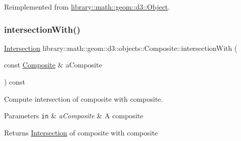 Reimplemented from \hyperlink{classlibrary_1_1math_1_1geom_1_1d3_1_1_object_a609b1ea1d5f868b004726622efabad5d}{library\+::math\+::geom\+::d3\+::\+Object}.

\mbox{\label{classlibrary_1_1math_1_1geom_1_1d3_1_1objects_1_1_composite_a56a243af1d865531cb56b99f607861ce}} 
\subsubsection{\texorpdfstring{intersection\+With()}{intersectionWith()}\hspace{0.1cm}{\footnotesize\ttfamily [2/2]}}
{\footnotesize\ttfamily \hyperlink{classlibrary_1_1math_1_1geom_1_1d3_1_1_intersection}{Intersection} library\+::math\+::geom\+::d3\+::objects\+::\+Composite\+::intersection\+With (\begin{DoxyParamCaption}\item[{const \hyperlink{classlibrary_1_1math_1_1geom_1_1d3_1_1objects_1_1_composite}{Composite} \&}]{a\+Composite }\end{DoxyParamCaption}) const}



Compute intersection of composite with composite. 


\begin{DoxyParams}[1]{Parameters}
\mbox{\tt in}  & {\em a\+Composite} & A composite \\
\hline
\end{DoxyParams}
\begin{DoxyReturn}{Returns}
\hyperlink{classlibrary_1_1math_1_1geom_1_1d3_1_1_intersection}{Intersection} of composite with composite 
\end{DoxyReturn}
\mbox{\label{classlibrary_1_1math_1_1geom_1_1d3_1_1objects_1_1_composite_abd37bc6f0b9132cee832d1628b76269c}} 
